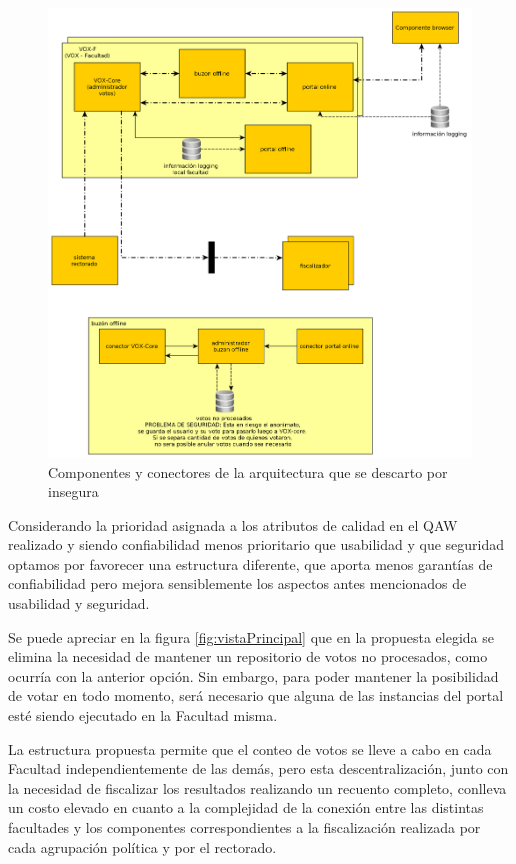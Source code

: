\begin{figure}[H]
	\begin{center}
		\includegraphics[scale=0.26]{../diagramas/arquitecturaInsegura.png}
	\end{center}
	\caption{Componentes y conectores de la arquitectura que se descarto por insegura}	
	\label{fig:arquitecturaInsegura}
\end{figure}

Considerando la prioridad asignada a los atributos de calidad en el QAW realizado y siendo confiabilidad menos prioritario que usabilidad y que seguridad optamos por favorecer una estructura diferente, que aporta menos garantías de confiabilidad pero mejora sensiblemente los aspectos antes mencionados de usabilidad y seguridad.

Se puede apreciar en la figura \ref{fig:vistaPrincipal} %
que en la propuesta elegida se elimina la necesidad de mantener un repositorio de votos no procesados, como ocurría con la anterior opción. Sin embargo, para poder mantener la posibilidad de votar en todo momento, será necesario que alguna de las instancias del portal esté siendo ejecutado en la Facultad misma. 

La estructura propuesta permite que el conteo de votos se lleve a cabo en cada Facultad independientemente de las demás, pero esta descentralización, junto con la necesidad de fiscalizar los resultados realizando un recuento completo, conlleva un costo elevado en cuanto a la complejidad de la conexión entre las distintas facultades y los componentes correspondientes a la fiscalización realizada por cada agrupación política y por el rectorado.

